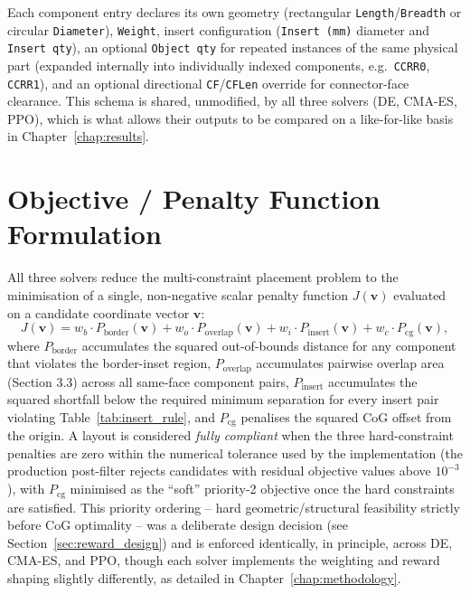 \documentclass[11pt,a4paper,oneside]{report}
\begin{document}
Each component entry declares its own geometry (rectangular \texttt{Length}/\texttt{Breadth} or circular \texttt{Diameter}), \texttt{Weight}, insert configuration (\texttt{Insert (mm)} diameter and \texttt{Insert qty}), an optional \texttt{Object qty} for repeated instances of the same physical part (expanded internally into individually indexed components, e.g.\ \texttt{CCRR0}, \texttt{CCRR1}), and an optional directional \texttt{CF}/\texttt{CFLen} override for connector-face clearance. This schema is shared, unmodified, by all three solvers (DE, CMA-ES, PPO), which is what allows their outputs to be compared on a like-for-like basis in Chapter~\ref{chap:results}.

\section{Objective / Penalty Function Formulation}
All three solvers reduce the multi-constraint placement problem to the minimisation of a single, non-negative scalar penalty function $J(\mathbf{v})$ evaluated on a candidate coordinate vector $\mathbf{v}$:
\begin{equation}
J(\mathbf{v}) = w_b \cdot P_{\text{border}}(\mathbf{v}) + w_o \cdot P_{\text{overlap}}(\mathbf{v}) + w_i \cdot P_{\text{insert}}(\mathbf{v}) + w_c \cdot P_{\text{cg}}(\mathbf{v}),
\label{eq:penalty}
\end{equation}
where $P_{\text{border}}$ accumulates the squared out-of-bounds distance for any component that violates the border-inset region, $P_{\text{overlap}}$ accumulates pairwise overlap area (Section 3.3) across all same-face component pairs, $P_{\text{insert}}$ accumulates the squared shortfall below the required minimum separation for every insert pair violating Table~\ref{tab:insert_rule}, and $P_{\text{cg}}$ penalises the squared CoG offset from the origin. A layout is considered \emph{fully compliant} when the three hard-constraint penalties are zero within the numerical tolerance used by the implementation (the production post-filter rejects candidates with residual objective values above $10^{-3}$), with $P_{\text{cg}}$ minimised as the ``soft'' priority-2 objective once the hard constraints are satisfied. This priority ordering -- hard geometric/structural feasibility strictly before CoG optimality -- was a deliberate design decision (see Section~\ref{sec:reward_design}) and is enforced identically, in principle, across DE, CMA-ES, and PPO, though each solver implements the weighting and reward shaping slightly differently, as detailed in Chapter~\ref{chap:methodology}.
\end{document}
